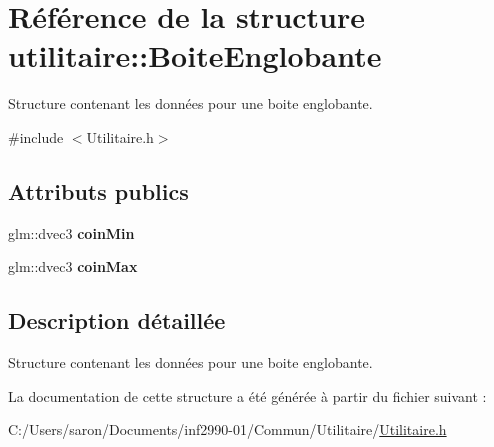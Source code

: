 \hypertarget{structutilitaire_1_1_boite_englobante}{\section{Référence de la structure utilitaire\-:\-:Boite\-Englobante}
\label{structutilitaire_1_1_boite_englobante}
}


Structure contenant les données pour une boite englobante.  




{\ttfamily \#include $<$Utilitaire.\-h$>$}

\subsection*{Attributs publics}
\begin{DoxyCompactItemize}
\item 
\hypertarget{structutilitaire_1_1_boite_englobante_a083f953a1ac5a830f70a2173a092e90a}{glm\-::dvec3 {\bfseries coin\-Min}}\label{structutilitaire_1_1_boite_englobante_a083f953a1ac5a830f70a2173a092e90a}

\item 
\hypertarget{structutilitaire_1_1_boite_englobante_af6f6d9ef23f6e5eb9f2f1ed6dd4d3e0e}{glm\-::dvec3 {\bfseries coin\-Max}}\label{structutilitaire_1_1_boite_englobante_af6f6d9ef23f6e5eb9f2f1ed6dd4d3e0e}

\end{DoxyCompactItemize}


\subsection{Description détaillée}
Structure contenant les données pour une boite englobante. 

La documentation de cette structure a été générée à partir du fichier suivant \-:\begin{DoxyCompactItemize}
\item 
C\-:/\-Users/saron/\-Documents/inf2990-\/01/\-Commun/\-Utilitaire/\hyperlink{_utilitaire_8h}{Utilitaire.\-h}\end{DoxyCompactItemize}
